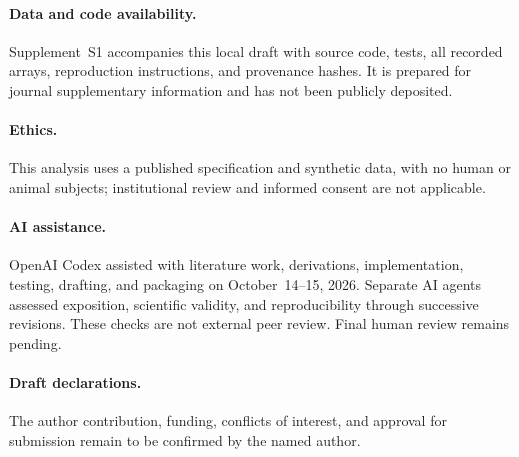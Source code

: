 \paragraph{Data and code availability.}
Supplement~S1 accompanies this local draft with source code, tests, all recorded
arrays, reproduction instructions, and provenance hashes. It is prepared for
journal supplementary information and has not been publicly deposited.

\paragraph{Ethics.}
This analysis uses a published specification and synthetic data, with no human
or animal subjects; institutional review and informed consent are not applicable.

\paragraph{AI assistance.}
OpenAI Codex assisted with literature work, derivations, implementation, testing,
drafting, and packaging on October~14--15, 2026. Separate AI agents assessed
exposition, scientific validity, and reproducibility through successive revisions.
These checks are not external peer review. Final human review remains pending.

\paragraph{Draft declarations.}
The author contribution, funding, conflicts of interest, and approval for
submission remain to be confirmed by the named author.
